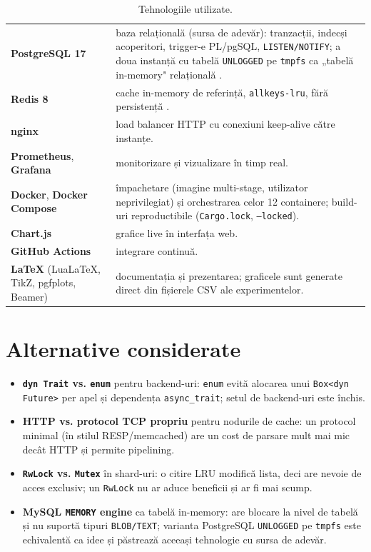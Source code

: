 \begin{table}[H]
\begin{tabularx}{\linewidth}{@{}p{38mm}X@{}}
\midrule
\textbf{PostgreSQL 17} & baza relațională (sursa de adevăr): tranzacții, indecși acoperitori, trigger-e
  PL/pgSQL, \texttt{LISTEN/NOTIFY}; a doua instanță cu tabelă \texttt{UNLOGGED} pe \texttt{tmpfs} ca
  „tabelă in-memory" relațională \cite{pg}. \\
\textbf{Redis 8} & cache in-memory de referință, \texttt{allkeys-lru}, fără persistență \cite{redis}. \\
\textbf{nginx} & load balancer HTTP cu conexiuni keep-alive către instanțe. \\
\textbf{Prometheus}, \textbf{Grafana} & monitorizare și vizualizare în timp real. \\
\textbf{Docker}, \textbf{Docker Compose} & împachetare (imagine multi-stage, utilizator neprivilegiat) și
  orchestrarea celor 12 containere; build-uri reproductibile (\texttt{Cargo.lock}, \texttt{--locked}). \\
\textbf{Chart.js} & grafice live în interfața web. \\
\textbf{GitHub Actions} & integrare continuă. \\
\textbf{\LaTeX} (LuaLaTeX, TikZ, pgfplots, Beamer) & documentația și prezentarea; graficele sunt
  generate direct din fișierele CSV ale experimentelor. \\
\bottomrule
\end{tabularx}
\caption{Tehnologiile utilizate.}
\end{table}

\section{Alternative considerate}

\begin{itemize}
  \item \textbf{\texttt{dyn Trait} vs. \texttt{enum}} pentru backend-uri: \texttt{enum} evită alocarea unui
        \texttt{Box<dyn Future>} per apel și dependența \texttt{async\_trait}; setul de backend-uri este închis.
  \item \textbf{HTTP vs. protocol TCP propriu} pentru nodurile de cache: un protocol minimal
        (în stilul RESP/memcached) are un cost de parsare mult mai mic decât HTTP și permite pipelining.
  \item \textbf{\texttt{RwLock} vs. \texttt{Mutex}} în shard-uri: o citire LRU modifică lista, deci are
        nevoie de acces exclusiv; un \texttt{RwLock} nu ar aduce beneficii și ar fi mai scump.
  \item \textbf{MySQL \texttt{MEMORY} engine} ca tabelă in-memory: are blocare la nivel de tabelă și nu
        suportă tipuri \texttt{BLOB/TEXT}; varianta PostgreSQL \texttt{UNLOGGED} pe \texttt{tmpfs} este
        echivalentă ca idee și păstrează aceeași tehnologie cu sursa de adevăr.
\end{itemize}
